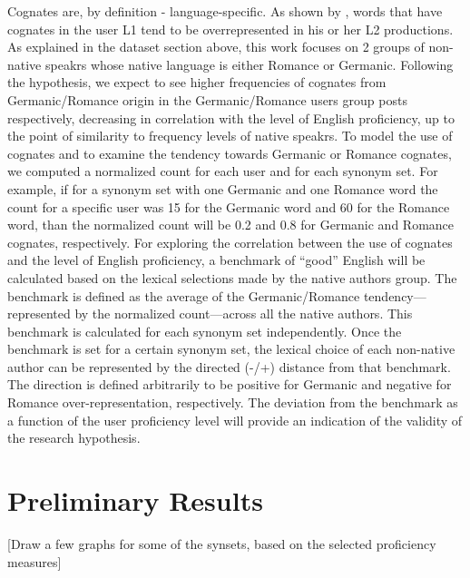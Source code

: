 \documentclass[11pt]{article}
\begin{document}
Cognates are, by definition - language-specific. As shown by \citet{TACL1403}, words that have  cognates in the user L1 tend to be overrepresented in his or her L2 productions. As explained in the dataset section above, this work focuses on 2 groups of non-native speakrs whose native language is either Romance or Germanic. Following the hypothesis, we expect to see higher frequencies of cognates from Germanic/Romance origin in the Germanic/Romance users group posts respectively, decreasing in correlation with the level of English proficiency, up to the point of similarity to frequency levels of native speakrs.
To model the use of cognates and to examine the tendency towards Germanic or Romance cognates, we computed a normalized count for each user and for each synonym set. 
For example, if for a synonym set with one Germanic and one Romance word the count for a specific user was 15 for the Germanic word and 60 for the Romance word, than the normalized count will be 0.2 and 0.8 for Germanic and Romance cognates, respectively.
For exploring the correlation between the use of cognates and the level of English proficiency, a benchmark of ``good'' English will be calculated based on the lexical selections made by the native authors group. The benchmark is defined as the average of the Germanic/Romance tendency---represented by the normalized count---across all the native authors. This benchmark is calculated for each synonym set independently.
Once the benchmark is set for a certain synonym set, the lexical choice of each non-native author can be represented by the directed (-/+) distance from that benchmark. The direction is defined arbitrarily to be positive for Germanic and negative for Romance over-representation, respectively.  The deviation from the benchmark as a function of the user proficiency level will provide an indication of the validity of the research hypothesis.


\section{Preliminary Results}

[Draw a few graphs for some of the synsets, based on the selected proficiency measures]




\end{document}
